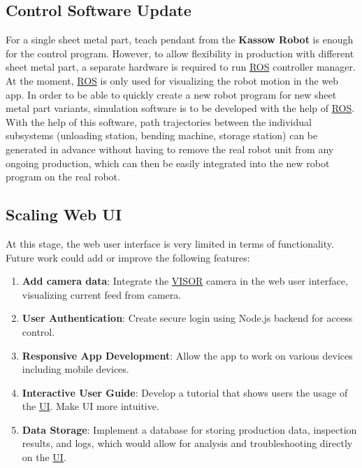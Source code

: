 \subsection{Control Software Update}
\label{subsec:control-software-update}
For a single sheet metal part, teach pendant from the \textbf{Kassow Robot} is enough for the control program.
However, to allow flexibility in production with different sheet metal part, a separate hardware is required
to run \hyperref[acro:ROS]{ROS} controller manager.
At the moment, \hyperref[acro:ROS]{ROS} is only used for visualizing the robot motion in the web app.
In order to be able to quickly create a new robot program for new sheet metal part variants, simulation
software is to be developed with the help of \hyperref[acro:ROS]{ROS}. With the help of this software, path trajectories between
the individual subsystems (unloading station, bending machine, storage station) can be generated in
advance without having to remove the real robot unit from any ongoing production, which can
then be easily integrated into the new robot program on the real robot.

\subsection{Scaling Web UI}
\label{subsec:web-ui-update}
At this stage, the web user interface is very limited in terms of functionality. Future work could add or improve the following features:
\begin{enumerate}
    \item \textbf{Add camera data}: Integrate the \hyperref[acro:VISOR]{VISOR}\textsuperscript{\textregistered} camera in the web user interface, visualizing current feed from camera.
    \item \textbf{User Authentication}: Create secure login using Node.js backend for access control.
    \item \textbf{Responsive App Development}: Allow the app to work on various devices including mobile devices.
    \item \textbf{Interactive User Guide}: Develop a tutorial that shows users the usage of the \hyperref[acro:UI]{UI}. Make UI more intuitive.
    \item \textbf{Data Storage}: Implement a database for storing production data, inspection results, and logs, which would allow for analysis and troubleshooting directly on the \hyperref[acro:UI]{UI}.
\end{enumerate}

